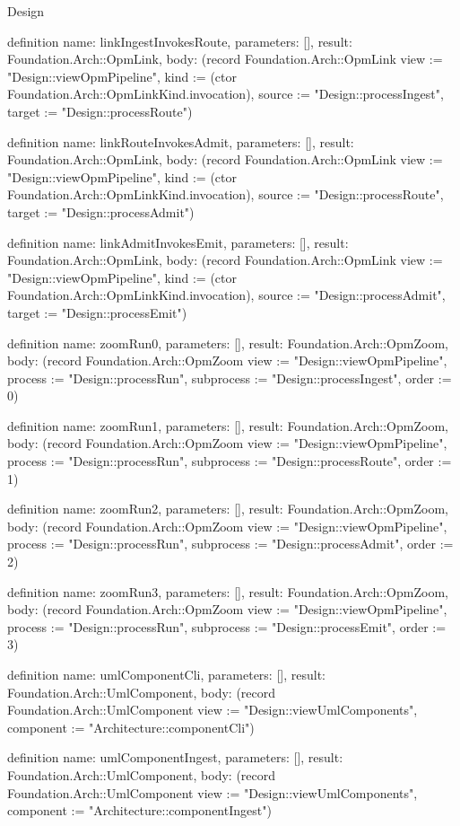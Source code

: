 \begin{lexlean}{Design}
\begin{semanticmodule}
definition{
  name: linkIngestInvokesRoute,
  parameters: [],
  result: Foundation.Arch::OpmLink,
  body: (record Foundation.Arch::OpmLink {view := "Design::viewOpmPipeline", kind := (ctor Foundation.Arch::OpmLinkKind.invocation), source := "Design::processIngest", target := "Design::processRoute"})
}

definition{
  name: linkRouteInvokesAdmit,
  parameters: [],
  result: Foundation.Arch::OpmLink,
  body: (record Foundation.Arch::OpmLink {view := "Design::viewOpmPipeline", kind := (ctor Foundation.Arch::OpmLinkKind.invocation), source := "Design::processRoute", target := "Design::processAdmit"})
}

definition{
  name: linkAdmitInvokesEmit,
  parameters: [],
  result: Foundation.Arch::OpmLink,
  body: (record Foundation.Arch::OpmLink {view := "Design::viewOpmPipeline", kind := (ctor Foundation.Arch::OpmLinkKind.invocation), source := "Design::processAdmit", target := "Design::processEmit"})
}

definition{
  name: zoomRun0,
  parameters: [],
  result: Foundation.Arch::OpmZoom,
  body: (record Foundation.Arch::OpmZoom {view := "Design::viewOpmPipeline", process := "Design::processRun", subprocess := "Design::processIngest", order := 0})
}

definition{
  name: zoomRun1,
  parameters: [],
  result: Foundation.Arch::OpmZoom,
  body: (record Foundation.Arch::OpmZoom {view := "Design::viewOpmPipeline", process := "Design::processRun", subprocess := "Design::processRoute", order := 1})
}

definition{
  name: zoomRun2,
  parameters: [],
  result: Foundation.Arch::OpmZoom,
  body: (record Foundation.Arch::OpmZoom {view := "Design::viewOpmPipeline", process := "Design::processRun", subprocess := "Design::processAdmit", order := 2})
}

definition{
  name: zoomRun3,
  parameters: [],
  result: Foundation.Arch::OpmZoom,
  body: (record Foundation.Arch::OpmZoom {view := "Design::viewOpmPipeline", process := "Design::processRun", subprocess := "Design::processEmit", order := 3})
}

definition{
  name: umlComponentCli,
  parameters: [],
  result: Foundation.Arch::UmlComponent,
  body: (record Foundation.Arch::UmlComponent {view := "Design::viewUmlComponents", component := "Architecture::componentCli"})
}

definition{
  name: umlComponentIngest,
  parameters: [],
  result: Foundation.Arch::UmlComponent,
  body: (record Foundation.Arch::UmlComponent {view := "Design::viewUmlComponents", component := "Architecture::componentIngest"})
}


\end{semanticmodule}
\end{lexlean}
